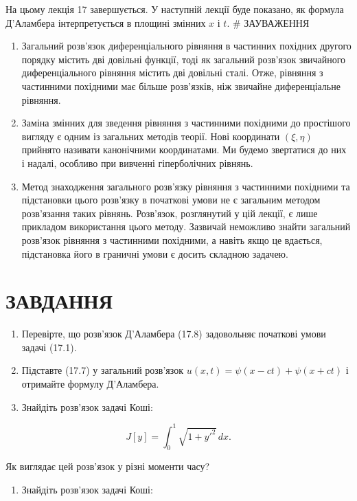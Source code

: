 \documentclass[
  ukrainian,
]{article}
\providecommand{\tightlist}{%
  \setlength{\itemsep}{0pt}\setlength{\parskip}{0pt}}
\begin{document}
На цьому лекція 17 завершується. У наступній лекції буде показано, як
формула Д'Аламбера інтерпретується в площині змінних \(x\) і \(t\). \#
ЗАУВАЖЕННЯ

\begin{enumerate}
\def\labelenumi{\arabic{enumi}.}
\item
  Загальний розв'язок диференціального рівняння в частинних похідних
  другого порядку містить дві довільні функції, тоді як загальний
  розв'язок звичайного диференціального рівняння містить дві довільні
  сталі. Отже, рівняння з частинними похідними має більше розв'язків,
  ніж звичайне диференціальне рівняння.
\item
  Заміна змінних для зведення рівняння з частинними похідними до
  простішого вигляду є одним із загальних методів теорії. Нові
  координати \((\xi, \eta)\) прийнято називати канонічними координатами.
  Ми будемо звертатися до них і надалі, особливо при вивченні
  гіперболічних рівнянь.
\item
  Метод знаходження загального розв'язку рівняння з частинними похідними
  та підстановки цього розв'язку в початкові умови не є загальним
  методом розв'язання таких рівнянь. Розв'язок, розглянутий у цій
  лекції, є лише прикладом використання цього методу. Зазвичай неможливо
  знайти загальний розв'язок рівняння з частинними похідними, а навіть
  якщо це вдається, підстановка його в граничні умови є досить складною
  задачею.
\end{enumerate}

\section{ЗАВДАННЯ}\label{ux437ux430ux432ux434ux430ux43dux43dux44f-11}

\begin{enumerate}
\def\labelenumi{\arabic{enumi}.}
\item
  Перевірте, що розв'язок Д'Аламбера (17.8) задовольняє початкові умови
  задачі (17.1).
\item
  Підставте (17.7) у загальний розв'язок
  \(u(x, t) = \psi(x - ct) + \psi(x + ct)\) і отримайте формулу
  Д'Аламбера.
\item
  Знайдіть розв'язок задачі Коші:
\end{enumerate}

\[
J[y] = \int_{0}^{1} \sqrt{1 + y'^{2}}\,dx.
\]

Як виглядає цей розв'язок у різні моменти часу?

\begin{enumerate}
\def\labelenumi{\arabic{enumi}.}
\setcounter{enumi}{3}
\tightlist
\item
  Знайдіть розв'язок задачі Коші:
\end{enumerate}
\end{document}
